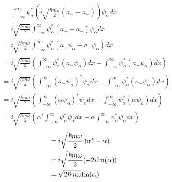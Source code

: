 \documentclass[11pt]{article}
\numberwithin{equation}{section}
\begin{document}
\begin{enumerate}[(a)]
\begin{align*}
&= \int_{-\infty}^{\infty}\psi_{\alpha}^*\left(i\sqrt{\frac{\hbar m\omega}{2}}(a_+-a_-)\right)\psi_{\alpha}dx\\
&= i\sqrt{\frac{\hbar m\omega}{2}}\int_{-\infty}^{\infty}\psi_{\alpha}^*(a_+-a_-)\psi_{\alpha}dx\\
&= i\sqrt{\frac{\hbar m\omega}{2}}\int_{-\infty}^{\infty}\psi_{\alpha}^*(a_+\psi_{\alpha}-a_-\psi_{\alpha})dx\\
&= i\sqrt{\frac{\hbar m\omega}{2}}\left(\int_{-\infty}^{\infty}\psi_{\alpha}^*(a_+\psi_{\alpha})dx-\int_{-\infty}^{\infty}\psi_{\alpha}^*(a_-\psi_{\alpha})dx\right)\\
&= i\sqrt{\frac{\hbar m\omega}{2}}\left(\int_{-\infty}^{\infty}(a_-\psi_{\alpha})^*\psi_{\alpha}dx-\int_{-\infty}^{\infty}\psi_{\alpha}^*(a_-\psi_{\alpha})dx\right)\\
&= i\sqrt{\frac{\hbar m\omega}{2}}\left(\int_{-\infty}^{\infty}(\alpha\psi_{\alpha})^*\psi_{\alpha}dx-\int_{-\infty}^{\infty}\psi_{\alpha}^*(\alpha\psi_{\alpha})dx\right)\\
&= i\sqrt{\frac{\hbar m\omega}{2}}\left(\alpha^*\int_{-\infty}^{\infty}\psi_{\alpha}^*\psi_{\alpha}dx-\alpha\int_{-\infty}^{\infty}\psi_{\alpha}^*\psi_{\alpha}dx\right)
\end{align*}
\begin{align*}
&= i\sqrt{\frac{\hbar m\omega}{2}}\left(\alpha^*-\alpha\right)\\
&= i\sqrt{\frac{\hbar m\omega}{2}}(-2i\textnormal{Im}(\alpha))\\
&= \sqrt{2\hbar m\omega}\textnormal{Im}(\alpha)
\end{align*}



\end{enumerate}
\end{document}
